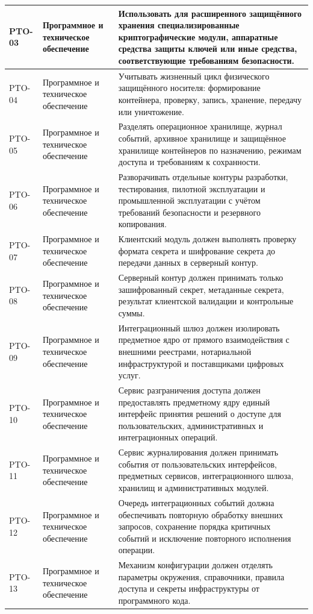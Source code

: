 \begin{longtable}{|P{1.45cm}|P{3.35cm}|P{10.7cm}|}
PTO-03 & Программное и техническое обеспечение & Использовать для расширенного защищённого хранения специализированные криптографические модули, аппаратные средства защиты ключей или иные средства, соответствующие требованиям безопасности.\\ \hline
PTO-04 & Программное и техническое обеспечение & Учитывать жизненный цикл физического защищённого носителя: формирование контейнера, проверку, запись, хранение, передачу или уничтожение.\\ \hline
PTO-05 & Программное и техническое обеспечение & Разделять операционное хранилище, журнал событий, архивное хранилище и защищённое хранилище контейнеров по назначению, режимам доступа и требованиям к сохранности.\\ \hline
PTO-06 & Программное и техническое обеспечение & Разворачивать отдельные контуры разработки, тестирования, пилотной эксплуатации и промышленной эксплуатации с учётом требований безопасности и резервного копирования.\\ \hline
PTO-07 & Программное и техническое обеспечение & Клиентский модуль должен выполнять проверку формата секрета и шифрование секрета до передачи данных в серверный контур.\\ \hline
PTO-08 & Программное и техническое обеспечение & Серверный контур должен принимать только зашифрованный секрет, метаданные секрета, результат клиентской валидации и контрольные суммы.\\ \hline
PTO-09 & Программное и техническое обеспечение & Интеграционный шлюз должен изолировать предметное ядро от прямого взаимодействия с внешними реестрами, нотариальной инфраструктурой и поставщиками цифровых услуг.\\ \hline
PTO-10 & Программное и техническое обеспечение & Сервис разграничения доступа должен предоставлять предметному ядру единый интерфейс принятия решений о доступе для пользовательских, административных и интеграционных операций.\\ \hline
PTO-11 & Программное и техническое обеспечение & Сервис журналирования должен принимать события от пользовательских интерфейсов, предметных сервисов, интеграционного шлюза, хранилищ и административных модулей.\\ \hline
PTO-12 & Программное и техническое обеспечение & Очередь интеграционных событий должна обеспечивать повторную обработку внешних запросов, сохранение порядка критичных событий и исключение повторного исполнения операции.\\ \hline
PTO-13 & Программное и техническое обеспечение & Механизм конфигурации должен отделять параметры окружения, справочники, правила доступа и секреты инфраструктуры от программного кода.\\ \hline

\end{longtable}
